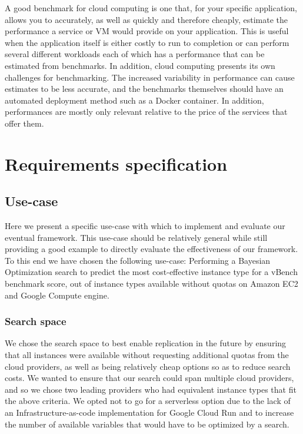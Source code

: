 \documentclass{report}
\begin{document}
A good benchmark for cloud computing is one that, for your specific application, allows you to accurately, as well as quickly and therefore cheaply, estimate the performance a service or VM would provide on your application. This is useful when the application itself is either costly to run to completion or can perform several different workloads each of which has a performance that can be estimated from benchmarks.
In addition, cloud computing presents its own challenges for benchmarking. The increased variability in performance can cause estimates to be less accurate, and the benchmarks themselves should have an automated deployment method such as a Docker container. In addition, performances are mostly only relevant relative to the price of the services that offer them\cite{Binnig2009}.

\chapter{Requirements specification}
\section{Use-case}
Here we present a specific use-case with which to implement and evaluate our eventual framework. This use-case should be relatively general while still providing a good example to directly evaluate the effectiveness of our framework. To this end we have chosen the following use-case: Performing a Bayesian Optimization search to predict the most cost-effective instance type for a vBench benchmark score, out of instance types available without quotas on Amazon EC2 and Google Compute engine.
\subsection{Search space}
We chose the search space to best enable replication in the future by ensuring that all instances were available without requesting additional quotas from the cloud providers, as well as being relatively cheap options so as to reduce search costs. We wanted to ensure that our search could span multiple cloud providers, and so we chose two leading providers who had equivalent instance types that fit the above criteria. We opted not to go for a serverless option due to the lack of an Infrastructure-as-code implementation for Google Cloud Run and to increase the number of available variables that would have to be optimized by a search.
\end{document}
